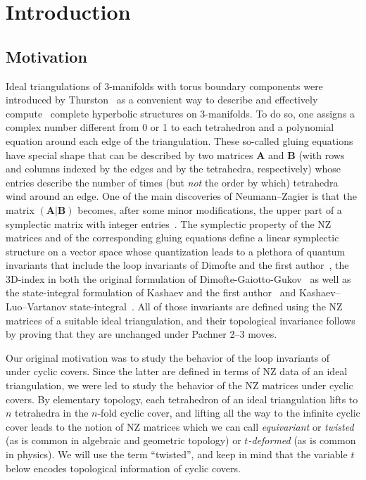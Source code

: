 \documentclass[12pt,reqno]{amsart}
\theoremstyle{definition}
\begin{document}
{\footnotesize
\tableofcontents
}


\section{Introduction}
\label{sec.intro}

\subsection{Motivation}
\label{sub.motivation}


Ideal triangulations of 3-manifolds with torus boundary components were introduced by
Thurston~\cite{Thurston} as a convenient way to describe and effectively
compute~\cite{snappy} complete hyperbolic structures on 3-manifolds. To do so,
one assigns a complex number different from 0 or 1 to each tetrahedron and
a polynomial equation around each edge of the triangulation. These so-called gluing
equations have special shape that can be described by two matrices $\mathbf{A}$ and
$\mathbf{B}$ (with rows and columns indexed by the edges and by the tetrahedra,
respectively) whose entries describe the number of times (but \emph{not}
the order by which) tetrahedra wind around an edge.
One of the main discoveries of Neumann--Zagier is that the matrix
$(\mathbf{A} | \mathbf{B})$ becomes, after some minor modifications, the upper part
of a symplectic matrix with integer entries~\cite{NZ}. The symplectic property of the
NZ matrices and of the corresponding gluing equations define a linear symplectic
structure on a vector space whose quantization leads to a plethora of quantum
invariants that include the loop invariants of Dimofte and the first
author~\cite{DG1,DG2}, the 3D-index in both the original formulation of
Dimofte-Gaiotto-Gukov~\cite{DGG1,DGG2} as well as the state-integral formulation
of Kashaev and the first author~\cite{GK:meromorphic} and Kashaev--Luo--Vartanov
state-integral~\cite{KLV,AGK:KLV}. All of those invariants are defined using the
NZ matrices of a suitable ideal triangulation, and their topological invariance
follows by proving that they are unchanged under Pachner 2--3 moves.

Our original motivation was to study the behavior of the loop invariants of~\cite{DG1}
under cyclic covers. Since the latter are defined in terms of NZ data of an ideal
triangulation, we were led to study the behavior of the NZ matrices under cyclic
covers. By elementary topology, each tetrahedron of an ideal triangulation lifts to
$n$ tetrahedra in the $n$-fold cyclic cover, and lifting all the way to the
infinite cyclic cover leads to the notion of NZ matrices which we can call
\emph{equivariant} or \emph{twisted} (as is common in algebraic and geometric topology)
or \emph{$t$-deformed} (as is common in physics). We will use the term ``twisted'',
and keep in mind that the variable $t$ below encodes topological information of cyclic
covers.
\end{document}
